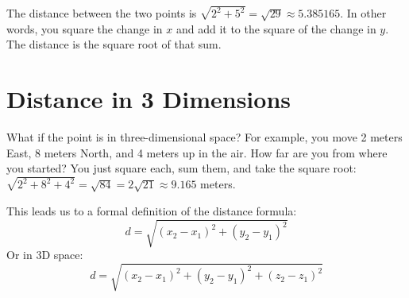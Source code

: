 The distance between the two points is $\sqrt{2^2 + 5^2} = \sqrt{29}
\approx 5.385165$. In other words, you square the change in $x$ and add it to
the square of the change in $y$. The distance is the square root of
that sum.

\section{Distance in 3 Dimensions}

What if the point is in three-dimensional space?  For example, you move 2
meters East, 8 meters North, and 4 meters up in the air. How far are
you from where you started?  You just square each, sum them, and take the square root:
$\sqrt{2^2 + 8^2 + 4^2} = \sqrt{84} = 2\sqrt{21} \approx 9.165$ meters.


This leads us to a formal definition of the distance formula:
\[
d = \sqrt{(x_2 - x_1)^2 + (y_2 - y_1)^2}
\]
Or in 3D space:
\[
d = \sqrt{(x_2 - x_1)^2 + (y_2 - y_1)^2 + (z_2 - z_1)^2}
\]
